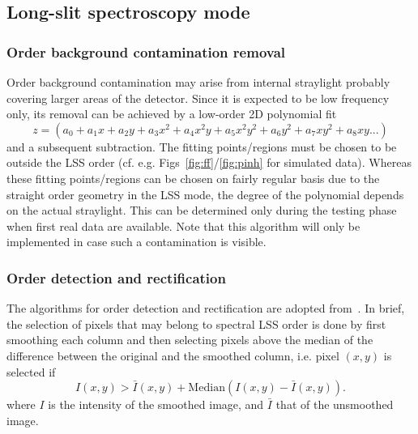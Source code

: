\subsection{Long-slit spectroscopy mode}
\label{ssec:algo_lss_spectroscopy}

\subsubsection{Order background contamination removal}\label{ssec:orderbg}
Order background contamination may arise from internal straylight probably covering larger areas of the detector. Since it is expected to be low frequency only, its removal can be achieved by a low-order 2D polynomial fit 
\begin{equation}
    z = (a_0 + a_1x + a_2y + a_3x^2 + a_4x^2y + a_5x^2y^2 + a_6y^2 + a_7xy^2 + a_8xy ...)
\end{equation}
and a subsequent subtraction. The fitting points/regions must be chosen to be outside the \ac{LSS} order (cf. e.g. Figs~\ref{fig:ff}/\ref{fig:pinh} for simulated data). Whereas these fitting points/regions can be chosen on fairly regular basis due to the straight order geometry in the \ac{LSS} mode, the degree of the polynomial depends on the actual straylight. This can be determined only during the testing phase when first real data are available. Note that this algorithm will only be implemented in case such a contamination is visible.

\subsubsection{Order detection and rectification}\label{ssec:orderhandling}
The algorithms for order detection and rectification are adopted from~\cite{pis02,pis21}.
In brief, the selection of pixels that may belong to spectral \ac{LSS} order is done by first smoothing each column and then selecting pixels above the median of the difference between the original
and the smoothed column, i.e. pixel $(x,y)$ is selected if
\begin{equation}
    I(x,y) > \bar{I}(x,y) + \mathrm{Median} ( I(x,y) - \bar{I}(x,y) ) .
\end{equation}
where $I$ is the intensity of the smoothed image, and $\bar{I}$ that of the unsmoothed image.


